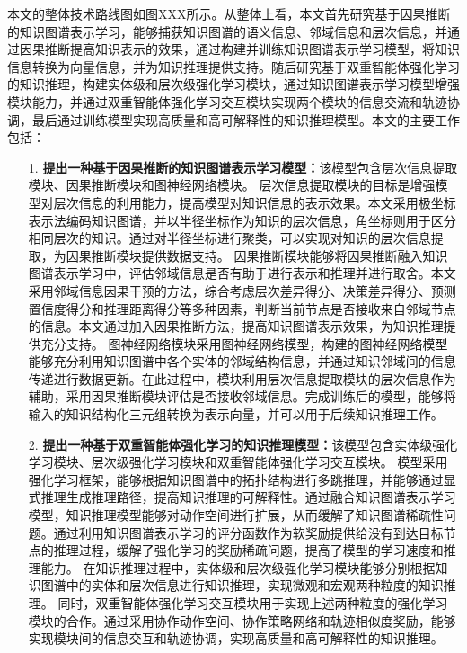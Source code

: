 \documentclass[algorithmlist, AutoFakeBold, AutoFakeSlant, figurelist, tablelist, nomlist, masters]{seuthesix}
\begin{document}
本文的整体技术路线图如图XXX所示。从整体上看，本文首先研究基于因果推断的知识图谱表示学习，能够捕获知识图谱的语义信息、邻域信息和层次信息，并通过因果推断提高知识表示的效果，通过构建并训练知识图谱表示学习模型，将知识信息转换为向量信息，并为知识推理提供支持。随后研究基于双重智能体强化学习的知识推理，构建实体级和层次级强化学习模块，通过知识图谱表示学习模型增强模块能力，并通过双重智能体强化学习交互模块实现两个模块的信息交流和轨迹协调，最后通过训练模型实现高质量和高可解释性的知识推理模型。本文的主要工作包括：

\begin{itemize}
  \item [1.]\textbf{提出一种基于因果推断的知识图谱表示学习模型：}该模型包含层次信息提取模块、因果推断模块和图神经网络模块。
  层次信息提取模块的目标是增强模型对层次信息的利用能力，提高模型对知识信息的表示效果。本文采用极坐标表示法编码知识图谱，并以半径坐标作为知识的层次信息，角坐标则用于区分相同层次的知识。通过对半径坐标进行聚类，可以实现对知识的层次信息提取，为因果推断模块提供数据支持。
  因果推断模块能够将因果推断融入知识图谱表示学习中，评估邻域信息是否有助于进行表示和推理并进行取舍。本文采用邻域信息因果干预的方法，综合考虑层次差异得分、决策差异得分、预测置信度得分和推理距离得分等多种因素，判断当前节点是否接收来自邻域节点的信息。本文通过加入因果推断方法，提高知识图谱表示效果，为知识推理提供充分支持。
  图神经网络模块采用图神经网络模型，构建的图神经网络模型能够充分利用知识图谱中各个实体的邻域结构信息，并通过知识邻域间的信息传递进行数据更新。在此过程中，模块利用层次信息提取模块的层次信息作为辅助，采用因果推断模块评估是否接收邻域信息。完成训练后的模型，能够将输入的知识结构化三元组转换为表示向量，并可以用于后续知识推理工作。
  \item [2.]\textbf{提出一种基于双重智能体强化学习的知识推理模型：}该模型包含实体级强化学习模块、层次级强化学习模块和双重智能体强化学习交互模块。
  模型采用强化学习框架，能够根据知识图谱中的拓扑结构进行多跳推理，并能够通过显式推理生成推理路径，提高知识推理的可解释性。通过融合知识图谱表示学习模型，知识推理模型能够对动作空间进行扩展，从而缓解了知识图谱稀疏性问题。通过利用知识图谱表示学习的评分函数作为软奖励提供给没有到达目标节点的推理过程，缓解了强化学习的奖励稀疏问题，提高了模型的学习速度和推理能力。
  在知识推理过程中，实体级和层次级强化学习模块能够分别根据知识图谱中的实体和层次信息进行知识推理，实现微观和宏观两种粒度的知识推理。
  同时，双重智能体强化学习交互模块用于实现上述两种粒度的强化学习模块的合作。通过采用协作动作空间、协作策略网络和轨迹相似度奖励，能够实现模块间的信息交互和轨迹协调，实现高质量和高可解释性的知识推理。
\end{itemize}
\end{document}
